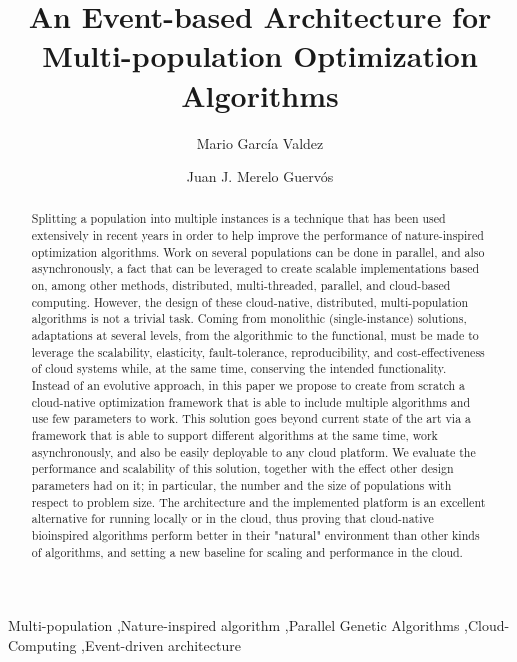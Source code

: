 \documentclass[review]{elsarticle}
\begin{document}
\lstset{language=Python} 
\begin{frontmatter}

\title{An Event-based Architecture for Multi-population Optimization Algorithms}

\author[itt]{Mario Garc\'ia Valdez}

\author[granada]{Juan J. Merelo Guerv\'os}

\address[itt]{Department of Graduate Studies, Instituto Tecnol\'ogico de Tijuana, Tijuana BC, Mexico}
\address[granada]{Department of Computer Architecture and Technology, Universidad de Granada, Granada, Spain}

\begin{abstract} 
Splitting a population into multiple instances is a technique that has
been used extensively in recent years in order to help improve the
performance of nature-inspired optimization algorithms. Work on
several populations can be done in parallel, and also asynchronously,
a fact that can be leveraged to create scalable implementations based
on, among other methods, distributed, multi-threaded, parallel, and
cloud-based computing.  However, the design of these cloud-native,
distributed, multi-population algorithms is not a trivial task. Coming
from monolithic (single-instance) solutions, adaptations at several
levels, from the algorithmic to the functional, must be made to
leverage the scalability, elasticity, fault-tolerance,
reproducibility, and cost-effectiveness of cloud systems while, at the
same time, conserving the intended functionality. Instead of an
evolutive approach, in this paper we propose to create from scratch a
cloud-native optimization framework that is able to include multiple
algorithms and use few parameters to work. This solution goes beyond
current state of the art via a framework that is able to support
different algorithms at the same time, work asynchronously, and also
be easily deployable to any cloud platform. We evaluate the
performance and scalability of this solution, together with the effect
other design parameters had on it; in particular, the number and the
size of populations with respect to problem size. The architecture and
the implemented platform is an excellent alternative for running
locally or in the cloud, thus proving that cloud-native bioinspired
algorithms perform better in their "natural" environment than other
kinds of algorithms, and setting a new baseline for scaling and
performance in the cloud.
\end{abstract}

\begin{keyword}
Multi-population \sep Nature-inspired algorithm \sep Parallel Genetic Algorithms \sep Cloud-Computing
\sep Event-driven architecture 
\end{keyword}

\end{frontmatter}
\end{document}
